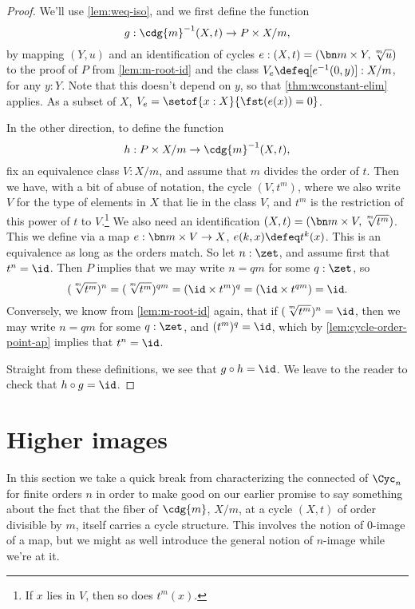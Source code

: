 \begin{proof}
  We'll use \cref{lem:weq-iso}, and we first define the function
  \[
    g : \cdg{m}^{-1}(X,t) \to P\times X/m,
  \]
  by mapping $(Y,u)$ and an identification of cycles
  $e : (X,t) = (\bn m\times Y,\sqrt[\uproot{2}m]{u})$
  to the proof of $P$ from \cref{lem:m-root-id}
  and the class $V_e\defeq [e^{-1}(0,y)]:X/m$, for any $y:Y$.
  Note that this doesn't depend on $y$, so that \cref{thm:wconstant-elim} applies.
  As a subset of $X$, $V_e=\setof{x:X}{\fst(e(x))=0}$.

  In the other direction, to define the function
  \[
    h : P\times X/m \to \cdg{m}^{-1}(X,t),
  \]
  fix an equivalence class $V:X/m$,
  and assume that $m$ divides the order of $t$.
  Then we have, with a bit of abuse of notation, the cycle $(V,t^m)$,
  where we also write $V$ for the type of elements in $X$ that lie in the class $V$,
  and $t^m$ is the restriction of this power of $t$ to $V$.\footnote{%
    If $x$ lies in $V$, then so does $t^m(x)$.}
  We also need an identification
  $(X,t)=(\bn m\times V,\sqrt[\uproot{2}m]{t^m})$.
  This we define via a map $e : \bn m\times V \to X$, $e(k,x) \defeq t^k(x)$.
  This is an equivalence as long as the orders match.
  So let $n:\zet$, and assume first that $t^n=\id$.
  Then $P$ implies that we may write $n=qm$ for some $q:\zet$,
  so
  \[
    (\sqrt[\uproot{2}m]{t^m})^n
    = (\sqrt[\uproot{2}m]{t^m})^{qm}
    = (\id \times t^m)^q = (\id \times t^{qm}) = \id.
  \]
  Conversely, we know from \cref{lem:m-root-id} again,
  that if $(\sqrt[\uproot{2}m]{t^m})^n=\id$,
  then we may write $n=qm$ for some $q:\zet$,
  and $(t^m)^q=\id$, which by \cref{lem:cycle-order-point-ap}
  implies that $t^n = \id$.

  Straight from these definitions, we see that $g\circ h=\id$.
  We leave to the reader to check that $h\circ g=\id$.
\end{proof}

\section{Higher images}
\label{sec:higher-images}

In this section we take a quick break from characterizing the connected \coverings
of $\Cyc_n$ for finite orders $n$ in order to make good on our earlier promise
to say something about the fact that the fiber of $\cdg{m}$, $X/m$, at a cycle $(X,t)$
of order divisible by $m$, itself carries a cycle structure.
This involves the notion of $0$-image of a map, but we might as well introduce the general
notion of $n$-image while we're at it.


